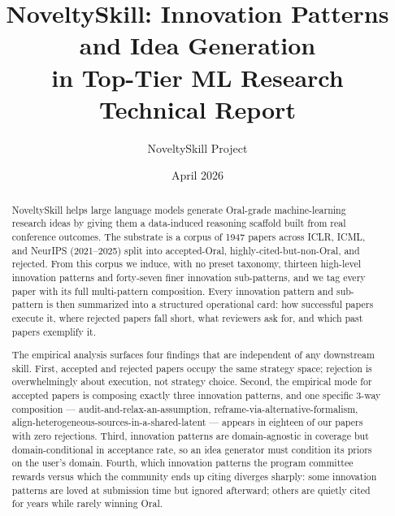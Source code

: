 \documentclass[10pt,a4paper]{article}
\title{\textbf{NoveltySkill: Innovation Patterns and Idea Generation\\in Top-Tier ML Research} \\[6pt] \large Technical Report}
\author{NoveltySkill Project}
\date{April 2026}
\begin{document}
\maketitle

\begin{abstract}
NoveltySkill helps large language models generate Oral-grade machine-learning research ideas by giving them a data-induced reasoning scaffold built from real conference outcomes. The substrate is a corpus of 1947 papers across ICLR, ICML, and NeurIPS (2021--2025) split into accepted-Oral, highly-cited-but-non-Oral, and rejected. From this corpus we induce, with no preset taxonomy, thirteen high-level innovation patterns and forty-seven finer innovation sub-patterns, and we tag every paper with its full multi-pattern composition. Every innovation pattern and sub-pattern is then summarized into a structured operational card: how successful papers execute it, where rejected papers fall short, what reviewers ask for, and which past papers exemplify it.

The empirical analysis surfaces four findings that are independent of any downstream skill. First, accepted and rejected papers occupy the same strategy space; rejection is overwhelmingly about execution, not strategy choice. Second, the empirical mode for accepted papers is composing exactly three innovation patterns, and one specific 3-way composition --- audit-and-relax-an-assumption, reframe-via-alternative-formalism, align-heterogeneous-sources-in-a-shared-latent --- appears in eighteen of our papers with zero rejections. Third, innovation patterns are domain-agnostic in coverage but domain-conditional in acceptance rate, so an idea generator must condition its priors on the user's domain. Fourth, which innovation patterns the program committee rewards versus which the community ends up citing diverges sharply: some innovation patterns are loved at submission time but ignored afterward; others are quietly cited for years while rarely winning Oral.


\end{abstract}
\end{document}
